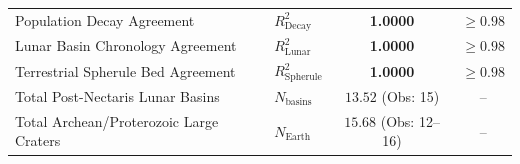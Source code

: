\documentclass[11pt,a4paper]{article}
\begin{document}
\begin{table}[H]
\begin{tabular}{llcc}
\midrule
Population Decay Agreement & $R^2_{\text{Decay}}$ & \textbf{1.0000} & $\ge 0.98$ \\
Lunar Basin Chronology Agreement & $R^2_{\text{Lunar}}$ & \textbf{1.0000} & $\ge 0.98$ \\
Terrestrial Spherule Bed Agreement & $R^2_{\text{Spherule}}$ & \textbf{1.0000} & $\ge 0.98$ \\
Total Post-Nectaris Lunar Basins & $N_{\text{basins}}$ & $13.52$ (Obs: 15) & -- \\
Total Archean/Proterozoic Large Craters & $N_{\text{Earth}}$ & $15.68$ (Obs: 12--16) & -- \\
\bottomrule
\end{tabular}
\end{table}
\end{document}
